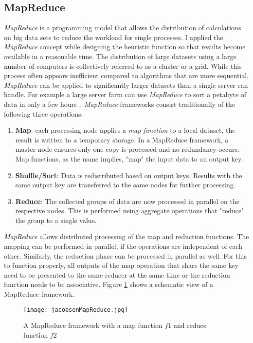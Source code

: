 \subsection{MapReduce}
\textit{MapReduce} is a programming model that allows the distribution of calculations on big data sets to reduce the workload for single processes. I applied the \textit{MapReduce} concept while designing the heuristic function so that results become available in a reasonable time. The distribution of large datasets using a large number of computers is collectively referred to as a cluster or a grid. While this process often appears inefficient compared to algorithms that are more sequential, \textit{MapReduce} can be applied to significantly larger datasets than a single server can handle. For example a large server farm can use \textit{MapReduce} to sort a petabyte of data in only a few hours~\cite{Czajkowski2011}. \textit{MapReduce} frameworks consist traditionally of the following three operations:
\begin{enumerate}
	\item \textbf{Map}: each processing node applies a \textit{map function} to a local dataset, the result is written to a temporary storage. In a MapReduce framework, a master node ensures only one copy is processed and no redundancy occurs. Map functions, as the name implies, "map" the input data to an output key.
	\item \textbf{Shuffle/Sort}: Data is redistributed based on output keys. Results with the same output key are transferred to the same nodes for further processing.
	\item \textbf{Reduce}: The collected groups of data are now processed in parallel on the respective nodes. This is performed using aggregate operations that "reduce" the group to a single value.
\end{enumerate}
\textit{MapReduce} allows distributed processing of the map and reduction functions. The mapping can be performed in parallel, if the operations are independent of each other. Similarly, the reduction phase can be processed in parallel as well. For this to function properly, all outputs of the map operation that share the same key need to be presented to the same reducer at the same time or the reduction function needs to be associative. Figure \ref{fig:mapReduce} shows a schematic view of a MapReduce framework.~\cite{Dean2008}
\begin{figure}
	\centering
	\texttt{[image: jacobsenMapReduce.jpg]}
	\caption{A MapReduce framework with a map function $f1$ and reduce function $f2$~\cite{Dean2008}}
	\label{fig:mapReduce}
\end{figure}
